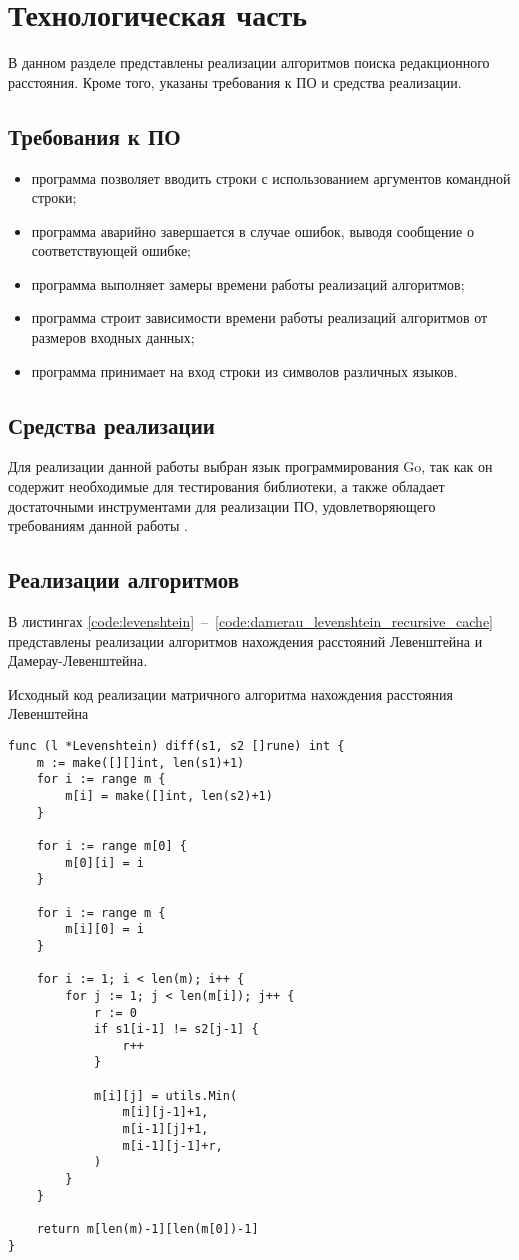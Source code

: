 \chapter{Технологическая часть}

В данном разделе представлены реализации алгоритмов поиска редакционного расстояния. Кроме того, указаны требования к ПО и средства реализации.

\section{Требования к ПО}
\begin{itemize}
	\item программа позволяет вводить строки с использованием аргументов командной строки;
	\item программа аварийно завершается в случае ошибок, выводя сообщение о соответствующей ошибке;
	\item программа выполняет замеры времени работы реализаций алгоритмов;
	\item программа строит зависимости времени работы реализаций алгоритмов от размеров входных данных;
	\item программа принимает на вход строки из символов различных языков.
\end{itemize}

\section{Средства реализации}
Для реализации данной работы выбран язык программирования Go, так как он содержит необходимые для тестирования библиотеки, а также обладает достаточными инструментами для реализации ПО, удовлетворяющего требованиям данной работы \cite{bib:3}.

\section{Реализации алгоритмов}
В листингах \ref{code:levenshtein}~--~\ref{code:damerau_levenshtein_recursive_cache} представлены реализации алгоритмов нахождения расстояний Левенштейна и Дамерау-Левенштейна.

\newpage

\begin{code}
\caption{Исходный код реализации матричного алгоритма нахождения расстояния Левенштейна}
\label{code:levenshtein}
\begin{verbatim}
func (l *Levenshtein) diff(s1, s2 []rune) int {
	m := make([][]int, len(s1)+1)
	for i := range m {
		m[i] = make([]int, len(s2)+1)
	}

	for i := range m[0] {
		m[0][i] = i
	}

	for i := range m {
		m[i][0] = i
	}

	for i := 1; i < len(m); i++ {
		for j := 1; j < len(m[i]); j++ {
			r := 0
			if s1[i-1] != s2[j-1] {
				r++
			}

			m[i][j] = utils.Min(
				m[i][j-1]+1,
				m[i-1][j]+1,
				m[i-1][j-1]+r,
			)
		}
	}

	return m[len(m)-1][len(m[0])-1]
}
\end{verbatim}
\end{code}

